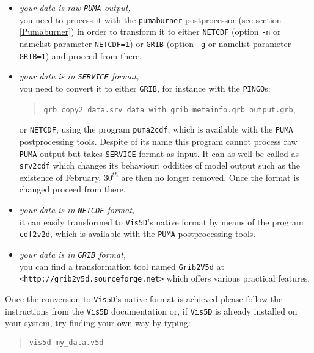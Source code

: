 \begin{itemize}
\item{{\it your data is raw \verb#PUMA# output,}\\
	you need to process it with the \verb#pumaburner#
	postprocessor (see section \ref{Pumaburner}) in order to
	transform it to either
	\verb#NETCDF#} (option \verb#-n# or namelist parameter
	\verb#NETCDF=1#) or \verb#GRIB# (option \verb#-g# or namelist
	parameter \verb#GRIB=1#) and proceed from there.
\item{{\it your data is in \verb#SERVICE# format,}\\
	you need to convert it to either \verb#GRIB#, for
	instance with the \verb#PINGO#s:
\begin{quote}
 \verb#grb copy2 data.srv data_with_grib_metainfo.grb output.grb#,
\end{quote}	
	or \verb#NETCDF#,
	using the program \verb#puma2cdf#, which is available with the
	\verb#PUMA# postprocessing tools. Despite of its name this
	program cannot process raw \verb#PUMA# output but takes
	\verb#SERVICE# format as input. It can as well be called as
	\verb#srv2cdf# which changes its behaviour: oddities of model
	output such as the existence of February, $30^{th}$ are
	then no longer removed.	Once the format is changed proceed from there.}
\item{{\it your data is in \verb#NETCDF# format,}\\
	it can easily transformed to \verb#Vis5D#'s native format by
	means of the program \verb#cdf2v2d#, which is available with
 	the \verb#PUMA# postprocessing tools.}
\item{{\it your data is in \verb#GRIB# format,\\}
	you can find a transformation tool named \verb#Grib2V5d# at\\
	\verb#<http://grib2v5d.sourceforge.net># which offers various
	practical features.}
\end{itemize}
\noindent Once the conversion to \verb#Vis5D#'s native format is
	achieved please follow the instructions from the \verb#Vis5D#
	documentation or, if \verb#Vis5D# is already installed on your
	system, try finding your own way by typing:
\begin{quote}
\verb#vis5d my_data.v5d#
\end{quote}

